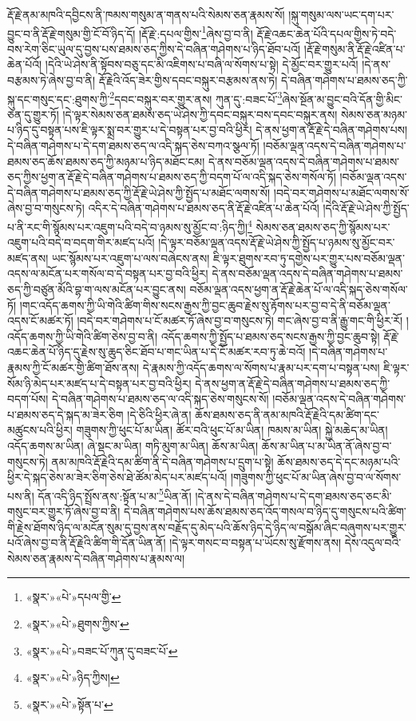 རྡོ་རྗེ་ནམ་མཁའི་དབྱིངས་ནི་ཁམས་གསུམ་ན་གནས་པའི་སེམས་ཅན་རྣམས་སོ། །སྐུ་གསུམ་ལས་ཡང་དག་པར་བྱུང་བ་ནི་རྡོ་རྗེ་གསུམ་གྱི་ངོ་བོ་ཉིད་དོ། །རྡོ་རྗེ་:དཔལ་གྱིས་\footnote{«སྣར་»«པེ་»དཔལ་གྱི་}ཞེས་བྱ་བ་ནི། རྡོ་རྗེ་འཆང་ཆེན་པོའི་དཔལ་གྱིས་ཏེ་བདེ་བས་རེག་ཅིང་ཡུལ་དུ་བྱས་པས་ཐམས་ཅད་ཀྱིས་དེ་བཞིན་གཤེགས་པ་ཉིད་ཐོབ་པའོ། །རྡོ་རྗེ་གསུམ་ནི་རྡོ་རྗེ་འཛིན་པ་ཆེན་པོའོ། །དེའི་ཡེ་ཤེས་ནི་སྟོབས་བཅུ་དང་མི་འཇིགས་པ་བཞི་ལ་སོགས་པ་སྟེ། དེ་མྱོང་བར་གྱུར་པའོ། །དེ་ནས་བརྩམས་ཏེ་ཞེས་བྱ་བ་ནི། རྡོ་རྗེའི་འོད་ཟེར་གྱིས་དབང་བསྐུར་བརྩམས་ནས་ཏེ། དེ་བཞིན་གཤེགས་པ་ཐམས་ཅད་ཀྱི་སྐུ་དང་གསུང་དང་:ཐུགས་ཀྱི་\footnote{«སྣར་»«པེ་»ཐུགས་ཀྱིས་}དབང་བསྐུར་བར་གྱུར་ནས། ཀུན་དུ་:བཟང་པོ་\footnote{«སྣར་»«པེ་»བཟང་པོ་ཀུན་དུ་བཟང་པོ་}ཞེས་སྔོན་མ་བྱུང་བའི་དོན་གྱི་མིང་ཅན་དུ་གྱུར་ཏོ། །དེ་ལྟར་སེམས་ཅན་ཐམས་ཅད་ཡེ་ཤེས་ཀྱི་དབང་བསྐུར་བས་དབང་བསྐུར་ནས། སེམས་ཅན་མཉམ་པ་ཉིད་དུ་བསྟན་པས་ཇི་ལྟར་སྨྲ་བར་གྱུར་པ་དེ་བསྟན་པར་བྱ་བའི་ཕྱིར། དེ་ནས་ཕྱག་ན་རྡོ་རྗེ་དེ་བཞིན་གཤེགས་པས། དེ་བཞིན་གཤེགས་པ་དེ་དག་ཐམས་ཅད་ལ་འདི་སྐད་ཅེས་བཀའ་སྩལ་ཏོ། །བཅོམ་ལྡན་འདས་དེ་བཞིན་གཤེགས་པ་ཐམས་ཅད་ཆོས་ཐམས་ཅད་ཀྱི་མཉམ་པ་ཉིད་མཐོང་ངམ། དེ་ནས་བཅོམ་ལྡན་འདས་དེ་བཞིན་གཤེགས་པ་ཐམས་ཅད་ཀྱིས་ཕྱག་ན་རྡོ་རྗེ་དེ་བཞིན་གཤེགས་པ་ཐམས་ཅད་ཀྱི་བདག་པོ་ལ་འདི་སྐད་ཅེས་གསོལ་ཏོ། །བཅོམ་ལྡན་འདས་དེ་བཞིན་གཤེགས་པ་ཐམས་ཅད་ཀྱི་རྡོ་རྗེ་ཡེ་ཤེས་ཀྱི་སྤྱོད་པ་མཐོང་ལགས་སོ། །བདེ་བར་གཤེགས་པ་མཐོང་ལགས་སོ་ཞེས་བྱ་བ་གསུངས་ཏེ། འདིར་དེ་བཞིན་གཤེགས་པ་ཐམས་ཅད་ནི་རྡོ་རྗེ་འཛིན་པ་ཆེན་པོའོ། །དེའི་རྡོ་རྗེ་ཡེ་ཤེས་ཀྱི་སྤྱོད་པ་ནི་རང་གི་སྙོམས་པར་འཇུག་པའི་བདེ་བ་ཉམས་སུ་མྱོང་བ་:ཉིད་ཀྱི།\footnote{«སྣར་»«པེ་»ཉིད་ཀྱིས།} སེམས་ཅན་ཐམས་ཅད་ཀྱི་སྙོམས་པར་འཇུག་པའི་བདེ་བ་བདག་གིར་མཛད་པའོ། །དེ་ལྟར་བཅོམ་ལྡན་འདས་རྡོ་རྗེ་ཡེ་ཤེས་ཀྱི་སྤྱོད་པ་ཉམས་སུ་མྱོང་བར་མཛད་ནས། ཡང་སྙོམས་པར་འཇུག་པ་ལས་བཞེངས་ནས། ཇི་ལྟར་ཐུགས་རབ་ཏུ་དགྱེས་པར་གྱུར་པས་བཅོམ་ལྡན་འདས་ལ་མངོན་པར་གསོལ་བ་དེ་བསྟན་པར་བྱ་བའི་ཕྱིར། དེ་ནས་བཅོམ་ལྡན་འདས་དེ་བཞིན་གཤེགས་པ་ཐམས་ཅད་ཀྱི་བཙུན་མོའི་བྷ་ག་ལས་མངོན་པར་བྱུང་ནས། བཅོམ་ལྡན་འདས་ཕྱག་ན་རྡོ་རྗེ་ཆེན་པོ་ལ་འདི་སྐད་ཅེས་གསོལ་ཏོ། །གང་འདོད་ཆགས་ཀྱི་ཡི་གེའི་ཚིག་གིས་སངས་རྒྱས་ཀྱི་བྱང་ཆུབ་རྗེས་སུ་རྟོགས་པར་བྱ་བ་དེ་ནི་བཅོམ་ལྡན་འདས་ངོ་མཚར་ཏོ། །བདེ་བར་གཤེགས་པ་ངོ་མཚར་ཏོ་ཞེས་བྱ་བ་གསུངས་ཏེ། གང་ཞེས་བྱ་བ་ནི་རྒྱུ་གང་གི་ཕྱིར་རོ། །འདོད་ཆགས་ཀྱི་ཡི་གེའི་ཚིག་ཅེས་བྱ་བ་ནི། འདོད་ཆགས་ཀྱི་སྤྱོད་པ་ཐམས་ཅད་སངས་རྒྱས་ཀྱི་བྱང་ཆུབ་སྟེ། རྡོ་རྗེ་འཆང་ཆེན་པོ་ཉིད་དུ་རྗེས་སུ་ཆུད་ཅིང་ཐོབ་པ་གང་ཡིན་པ་དེ་ངོ་མཚར་རབ་ཏུ་ཆེ་བའོ། །དེ་བཞིན་གཤེགས་པ་རྣམས་ཀྱི་ངོ་མཚར་གྱི་ཚིག་ཐོས་ནས། དེ་རྣམས་ཀྱི་འདོད་ཆགས་ལ་སོགས་པ་རྣམ་པར་དག་པ་བསྟན་པས། ཇི་ལྟར་སོམ་ཉི་མེད་པར་མཛད་པ་དེ་བསྟན་པར་བྱ་བའི་ཕྱིར། དེ་ནས་ཕྱག་ན་རྡོ་རྗེ་དེ་བཞིན་གཤེགས་པ་ཐམས་ཅད་ཀྱི་བདག་པོས། དེ་བཞིན་གཤེགས་པ་ཐམས་ཅད་ལ་འདི་སྐད་ཅེས་གསུངས་སོ། །བཅོམ་ལྡན་འདས་དེ་བཞིན་གཤེགས་པ་ཐམས་ཅད་དེ་སྐད་མ་ཟེར་ཅིག །དེ་ཅིའི་ཕྱིར་ཞེ་ན། ཆོས་ཐམས་ཅད་ནི་ནམ་མཁའི་རྡོ་རྗེའི་དམ་ཚིག་དང་མཚུངས་པའི་ཕྱིར། གཟུགས་ཀྱི་ཕུང་པོ་མ་ཡིན། ཚོར་བའི་ཕུང་པོ་མ་ཡིན། ཁམས་མ་ཡིན། སྐྱེ་མཆེད་མ་ཡིན། འདོད་ཆགས་མ་ཡིན། ཞེ་སྡང་མ་ཡིན། གཏི་མུག་མ་ཡིན། ཆོས་མ་ཡིན། ཆོས་མ་ཡིན་པ་མ་ཡིན་ནོ་ཞེས་བྱ་བ་གསུངས་ཏེ། ནམ་མཁའི་རྡོ་རྗེའི་དམ་ཚིག་ནི་དེ་བཞིན་གཤེགས་པ་དྲུག་པ་སྟེ། ཆོས་ཐམས་ཅད་དེ་དང་མཉམ་པའི་ཕྱིར་དེ་སྐད་ཅེས་མ་ཟེར་ཅིག་ཅེས་ཐེ་ཚོམ་མེད་པར་མཛད་པའོ། །གཟུགས་ཀྱི་ཕུང་པོ་མ་ཡིན་ཞེས་བྱ་བ་ལ་སོགས་པས་ནི། དོན་འདི་ཉིད་སྤྲོས་ནས་:སྟོན་པ་མ་\footnote{«སྣར་»«པེ་»སྟོན་པ་}ཡིན་ནོ། །དེ་ནས་དེ་བཞིན་གཤེགས་པ་དེ་དག་ཐམས་ཅད་ཅང་མི་གསུང་བར་གྱུར་ཏོ་ཞེས་བྱ་བ་ནི། དེ་བཞིན་གཤེགས་པས་ཆོས་ཐམས་ཅད་འོད་གསལ་བ་ཉིད་དུ་གསུངས་པའི་ཚིག་གི་རྗེས་ཐོགས་ཉིད་ལ་མངོན་སུམ་དུ་བྱས་ནས་བརྗོད་དུ་མེད་པའི་ཆོས་ཉིད་དེ་ཉིད་ལ་བསྒོམ་ཞིང་བཞུགས་པར་གྱུར་པའོ་ཞེས་བྱ་བ་ནི་རྡོ་རྗེའི་ཚིག་གི་དོན་ཡིན་ནོ། །དེ་ལྟར་གསང་བ་བསྟན་པ་ཡོངས་སུ་རྫོགས་ནས། དེས་འདུལ་བའི་སེམས་ཅན་རྣམས་དེ་བཞིན་གཤེགས་པ་རྣམས་ལ། 